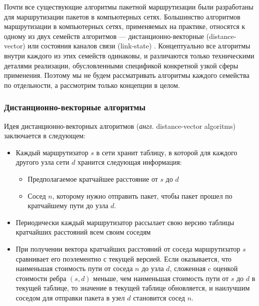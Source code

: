 \documentclass[specification,annotation,times]{itmo-student-thesis}
\theoremstyle{definition}
\begin{document}
Почти все существующие алгоритмы пакетной маршрутизации были разработаны для
маршрутизации пакетов в компьютерных сетях. Большинство алгоритмов маршрутизации
в компьютерных сетях, применяемых на практике, относятся к одному из двух
семейств алгоритмов --- дистанционно-векторные (distance-vector) \cite{arpanet-orig} или
состояния каналов связи (link-state) \cite{link-state-arpanet}.
Концептуально все алгоритмы внутри каждого из этих семейств одинаковы, и различаются только
техническими деталями реализации, обусловленными спецификой конкретной узкой
сферы применения. Поэтому мы не будем рассматривать алгоритмы каждого семейства
по отдельности, а рассмотрим только концепции в целом.

\subsubsection{Дистанционно-векторные алгоритмы}\label{overview:networks:dv}

Идея дистанционно-векторных алгоритмов (\textit{англ.} distance-vector algoritms) заключается в
следующем:

\begin{itemize}
\item Каждый маршрутизатор $s$ в сети хранит таблицу, в которой для каждого другого узла
  сети $d$ хранится следующая информация:
  \begin{itemize}
  \item Предполагаемое кратчайшее расстояние от $s$ до $d$
  \item Сосед $n$, которому нужно отправить пакет, чтобы пакет прошел по
    кратчайшему пути до узла $d$.
  \end{itemize}
\item Периодически каждый маршрутизатор рассылает свою версию таблицы кратчайших
  расстояний всем своим соседям
\item При получении вектора кратчайших расстояний от соседа маршрутизатор $s$
  сравнивает его поэлементно с текущей версией. Если оказывается, что наименьшая
  стоимость пути от соседа $n$ до узла $d$, сложенная c оценкой стоимости ребра
  $(s, d)$ меньше, чем наименьшая стоимость пути от $s$ до $d$ в текущей
  таблице, то значение в текущей таблице обновляется, и наилучшим соседом для
  отправки пакета в узел $d$ становится сосед $n$.
\end{itemize}
\end{document}
